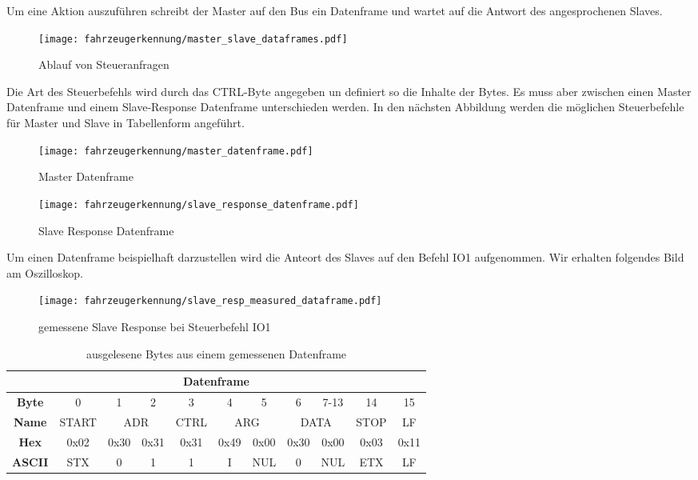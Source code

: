 Um eine Aktion auszuführen schreibt der Master auf den Bus ein Datenframe und wartet auf die Antwort des angesprochenen Slaves. 

\begin{figure}[H]
    \centering
    \texttt{[image: fahrzeugerkennung/master\_slave\_dataframes.pdf]}
    \caption{Ablauf von Steueranfragen}
\end{figure}

Die Art des Steuerbefehls wird durch das CTRL-Byte angegeben un definiert so die Inhalte der Bytes. Es muss aber zwischen einen Master Datenframe und einem Slave-Response Datenframe unterschieden werden. 
In den nächsten Abbildung werden die möglichen Steuerbefehle für Master und Slave in Tabellenform angeführt.

\begin{sidewaysfigure} 
    \centering
    \texttt{[image: fahrzeugerkennung/master\_datenframe.pdf]}
    \caption{Master Datenframe}
    \label{fig:master_frame}
\end{sidewaysfigure}

\begin{sidewaysfigure}
    \centering
    \texttt{[image: fahrzeugerkennung/slave\_response\_datenframe.pdf]}
    \caption{Slave Response Datenframe}
\end{sidewaysfigure}
\pagebreak
Um einen Datenframe beispielhaft darzustellen wird die Anteort des Slaves auf den Befehl IO1 aufgenommen.
Wir erhalten folgendes Bild am Oszilloskop.

\begin{figure}[H]
    \centering
    \texttt{[image: fahrzeugerkennung/slave\_resp\_measured\_dataframe.pdf]}
    \caption{gemessene Slave Response bei Steuerbefehl IO1}
\end{figure}

\begin{table}[h]
    \centering
    \begin{tabular}{|c|c|c|c|c|c|c|c|c|l|l|l|l|l|l|c|c|}
        \hline
        \multicolumn{17}{|c|}{\textbf{Datenframe}}                                                                                           \\ \hline
        \textbf{Byte}  & 0     & 1           & 2          & 3    & 4           & 5          & 6    & \multicolumn{7}{c|}{7-13} & 14   & 15   \\ \hline
        \textbf{Name}  & START & \multicolumn{2}{c|}{ADR} & CTRL & \multicolumn{2}{c|}{ARG} & \multicolumn{8}{c|}{DATA}        & STOP & LF   \\ \hline
        \textbf{Hex}   & 0x02  & 0x30        & 0x31       & 0x31 & 0x49        & 0x00       & 0x30 & \multicolumn{7}{c|}{0x00} & 0x03 & 0x11 \\ \hline
        \textbf{ASCII} & STX   & 0           & 1          & 1    & I           & NUL        & 0    & \multicolumn{7}{c|}{NUL}  & ETX  & LF   \\ \hline
    \end{tabular}
    \caption{ausgelesene Bytes aus einem gemessenen Datenframe}
\end{table}

